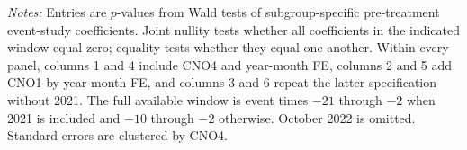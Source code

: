 \noindent\begin{minipage}{\linewidth}
\footnotesize
\emph{Notes:} Entries are $p$-values from Wald tests of subgroup-specific pre-treatment event-study coefficients. Joint nullity tests whether all coefficients in the indicated window equal zero; equality tests whether they equal one another. Within every panel, columns 1 and 4 include CNO4 and year-month FE, columns 2 and 5 add CNO1-by-year-month FE, and columns 3 and 6 repeat the latter specification without 2021. The full available window is event times $-21$ through $-2$ when 2021 is included and $-10$ through $-2$ otherwise. October 2022 is omitted. Standard errors are clustered by CNO4.
\end{minipage}
\endgroup
